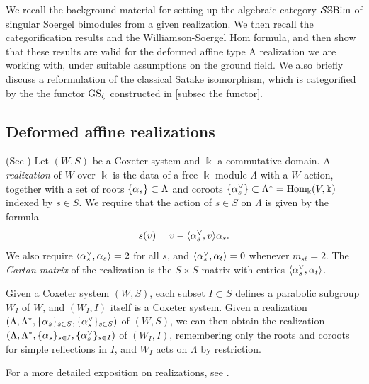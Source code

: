 
We recall the background material for setting up the algebraic category $\mathcal{S}\mathbb{S}\text{Bim}$ of singular Soergel bimodules from a given realization. We then recall the categorification results and the Williamson-Soergel Hom formula, and then show that these results are valid for the deformed affine type A realization we are working with, under suitable assumptions on the ground field. We also briefly discuss a reformulation of the classical Satake isomorphism, which is categorified by the the functor $\operatorname{GS}_\zeta$ constructed in \cref{subsec the functor}.

\subsection{Deformed affine realizations}
\label{subsec- realizations}


\begin{defn} (See \cite[Definition 3.1]{EWGr4sb}) Let $(W,S)$ be a Coxeter system and $\Bbbk$ a commutative domain. A \emph{realization} of $W$ over $\Bbbk$ is the data of a free
$\Bbbk$ module $\Lambda$ with a $W$-action, together with a set of roots $\{\alpha_s\} \subset \Lambda$ and coroots $\{\alpha_s^\vee\} \subset \Lambda^*=\operatorname{Hom}_{\Bbbk}(V,\Bbbk)$ indexed by $s \in S$. We require that the action of
$s \in S$ on $\Lambda$ is given by the formula \[ s(v) = v - \langle \alpha_s^\vee, v \rangle \alpha_s. \] We also require $\langle \alpha_s^\vee, \alpha_s \rangle = 2$ for all $s$, and $\langle
\alpha_s^\vee, \alpha_t \rangle = 0$ whenever $m_{st} = 2$. The \emph{Cartan matrix} of the realization is the $S \times S$ matrix with entries $\langle \alpha_s^\vee, \alpha_t \rangle$.
\end{defn}

Given a Coxeter system $(W,S)$, each subset $I \subset S$ defines a parabolic subgroup $W_I$ of $W$, and $(W_I,I)$ itself is a Coxeter system. 
Given a realization $(\Lambda,\Lambda^*,\{\alpha_s\}_{s\in S},\{\alpha_s^\vee\}_{s \in S})$ of $(W,S)$, we can then obtain the realization $(\Lambda,\Lambda^*, \{\alpha_s\}_{s \in I}, \{\alpha_s^\vee\}_{s\in I})$ of $(W_I,I)$, remembering only the roots and coroots for simple reflections in $I$, and $W_I$ acts on $\Lambda$ by restriction.

For a more detailed exposition on realizations, see \cite[Section 5.7]{EMTW}.

